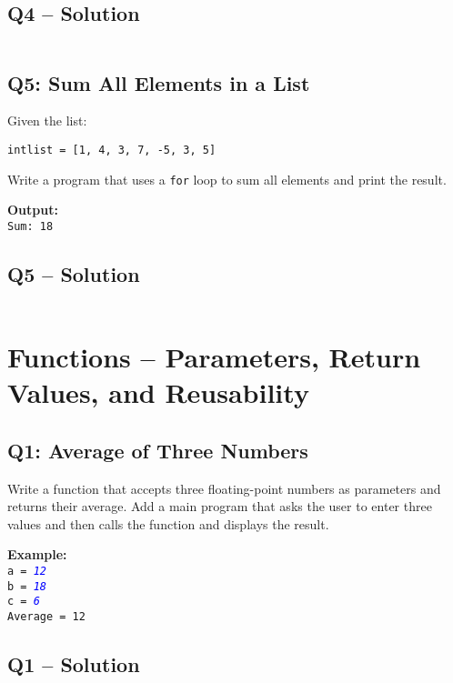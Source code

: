 \documentclass[a4paper,11pt]{article}
\begin{document}
		
	\subsection*{Q4 – Solution}
	\inputminted{python}{Files/3/4.py}
	
	\subsection*{Q5: Sum All Elements in a List}
	Given the list:
	
	\texttt{intlist = [1, 4, 3, 7, -5, 3, 5]}
	
	Write a program that uses a \texttt{for} loop to sum all elements and print the result.
	
	\textbf{Output:}\\
	\texttt{Sum: 18}
	

	
	\subsection*{Q5 – Solution}
	\inputminted{python}{Files/3/5.py}
	
		
	
\newpage

\section{Functions – Parameters, Return Values, and Reusability}

\subsection*{Q1: Average of Three Numbers}
Write a function that accepts three floating-point numbers as parameters and returns their average. Add a main program that asks the user to enter three values and then calls the function and displays the result.

\textbf{Example:}\\
\texttt{a = \textcolor{blue}{\textit{12}}}\\
\texttt{b = \textcolor{blue}{\textit{18}}}\\
\texttt{c = \textcolor{blue}{\textit{6}}}\\
\texttt{Average = 12}

\subsection*{Q1 – Solution}
\inputminted{python}{Files/4/1.py}
\end{document}
